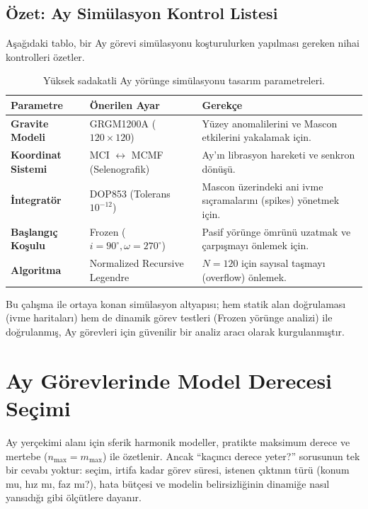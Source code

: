 \subsection{Özet: Ay Simülasyon Kontrol Listesi}

Aşağıdaki tablo, bir Ay görevi simülasyonu koşturulurken yapılması gereken nihai kontrolleri özetler.

\begin{table}[h]
\centering
\renewcommand{\arraystretch}{1.3}
\begin{tabular}{|l|p{5cm}|p{6cm}|}
\hline
\textbf{Parametre} & \textbf{Önerilen Ayar} & \textbf{Gerekçe} \\ \hline
\textbf{Gravite Modeli} & GRGM1200A ($120 \times 120$) & Yüzey anomalilerini ve Mascon etkilerini yakalamak için. \\ \hline
\textbf{Koordinat Sistemi} & MCI $\leftrightarrow$ MCMF (Selenografik) & Ay'ın librasyon hareketi ve senkron dönüşü. \\ \hline
\textbf{İntegratör} & DOP853 (Tolerans $10^{-12}$) & Mascon üzerindeki ani ivme sıçramalarını (spikes) yönetmek için. \\ \hline
\textbf{Başlangıç Koşulu} & Frozen ($i=90^\circ, \omega=270^\circ$) & Pasif yörünge ömrünü uzatmak ve çarpışmayı önlemek için. \\ \hline
\textbf{Algoritma} & Normalized Recursive Legendre & $N=120$ için sayısal taşmayı (overflow) önlemek. \\ \hline
\end{tabular}
\caption{Yüksek sadakatli Ay yörünge simülasyonu tasarım parametreleri.}
\label{tab:lunar_sim_checklist}
\end{table}

Bu çalışma ile ortaya konan simülasyon altyapısı; hem statik alan doğrulaması (ivme haritaları) hem de dinamik görev testleri (Frozen yörünge analizi) ile doğrulanmış, Ay görevleri için güvenilir bir analiz aracı olarak kurgulanmıştır.




\section{Ay Görevlerinde Model Derecesi Seçimi}

Ay yerçekimi alanı için sferik harmonik modeller, pratikte maksimum derece ve mertebe
($n_{\max}=m_{\max}$) ile özetlenir. Ancak ``kaçıncı derece yeter?'' sorusunun tek bir cevabı yoktur:
seçim, irtifa kadar görev süresi, istenen çıktının türü (konum mu, hız mı, faz mı?),
hata bütçesi ve modelin belirsizliğinin dinamiğe nasıl yansıdığı gibi ölçütlere dayanır.


